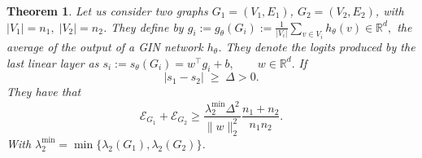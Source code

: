 \documentclass[11pt]{article}\usepackage{amsmath,amssymb,amsthm,bbm}
\newtheorem{theorem}{Theorem}
\newcommand{\EE}{\mathcal{E}}
\newcommand{\RR}{\mathbb{R}}
\newcommand{\1}{\mathbbm{1}}
\begin{document}
\begin{theorem}
Let us consider two graphs $G_1 = (V_1, E_1) $, $G_2 = (V_2, E_2) $, with $ |V_1| = n_1, \; |V_2| = n_2$.
They define by \(
g_i:=g_\theta(G_i):=\frac1{|V_i|}\sum_{v\in V_i} h_\theta(v)\in\RR^{d},\) the average of the output of a GIN network $h_\theta$. 
They denote the logits produced by the last linear layer as 
\(
s_i:=s_\theta(G_i)=w^{\top} g_i+b, \qquad w\in\RR^{d}.\)
If 
\[
|s_1-s_2|\;\ge\;\Delta>0.\]
They have that 
    \begin{equation}\displaystyle\EE_{G_1}+\EE_{G_2}\ge \frac{ \lambda_2^{\operatorname{min}} \Delta^{2}}{\|w \|^2_2}  \frac{n_1 + n_2 }{n_1 n_2}.\end{equation}
With $\lambda_2^{\operatorname{min}}  = \operatorname{min} \{ \lambda_2(G_1), \lambda_2(G_2) \}$. 
\end{theorem}
\end{document}
